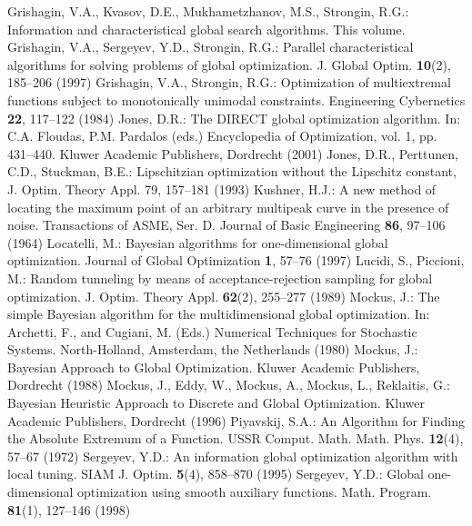 \begin{thebibliography}{99.}
 Grishagin, V.A., Kvasov, D.E., Mukhametzhanov, M.S., Strongin, R.G.: Information and characteristical global search algorithms. This volume.
 Grishagin, V.A., Sergeyev, Y.D., Strongin, R.G.: Parallel characteristical algorithms for solving problems of global optimization. J. Global Optim. \textbf{10}(2), 185–206 (1997)
 Grishagin, V.A., Strongin, R.G.: Optimization of multiextremal functions subject to monotonically unimodal constraints. Engineering Cybernetics \textbf{22},  117--122 (1984)
Jones, D.R.: The DIRECT global optimization algorithm. In: C.A. Floudas, P.M. Pardalos
(eds.) Encyclopedia of Optimization, vol. 1, pp. 431–440. Kluwer Academic Publishers, Dordrecht (2001)
Jones, D.R., Perttunen, C.D.,   Stuckman, B.E.: Lipschitzian optimization
without the Lipschitz constant, J. Optim. Theory Appl. 79,  157--181 (1993)
	Kushner, H.J.: A new method of locating the maximum point of an arbitrary multipeak curve in the presence of noise. Transactions of ASME, Ser. D. Journal of Basic Engineering \textbf{86}, 97--106 (1964)
 Locatelli, M.: Bayesian algorithms for one-dimensional global optimization. Journal of Global Optimization \textbf{1}, 57--76 (1997)
 Lucidi, S., Piccioni, M.:  Random tunneling by means of acceptance-rejection sampling for global optimization. J. Optim. Theory Appl. \textbf{62}(2), 255--277 (1989)
 Mockus, J.: The simple Bayesian algorithm for the multidimensional global optimization. In: Archetti, F., and Cugiani, M. (Eds.) Numerical Techniques for Stochastic Systems. North-Holland, Amsterdam,
the Netherlands (1980)
	Mockus, J.: Bayesian Approach to Global Optimization. Kluwer Academic Publishers, Dordrecht (1988)
 Mockus, J., Eddy, W., Mockus, A., Mockus, L., Reklaitis, G.: Bayesian Heuristic Approach
to Discrete and Global Optimization. Kluwer Academic Publishers, Dordrecht (1996)
	Piyavskij, S.A.: An Algorithm for Finding the Absolute Extremum of a Function. USSR Comput. Math. Math. Phys. \textbf{12}(4), 57--67 (1972)
 Sergeyev, Y.D.: An information global optimization algorithm with local tuning. SIAM J. Optim. \textbf{5}(4), 858–870 (1995)
 Sergeyev, Y.D.: Global one-dimensional optimization using smooth auxiliary functions. Math. Program. \textbf{81}(1), 127–146 (1998)

\end{thebibliography}
